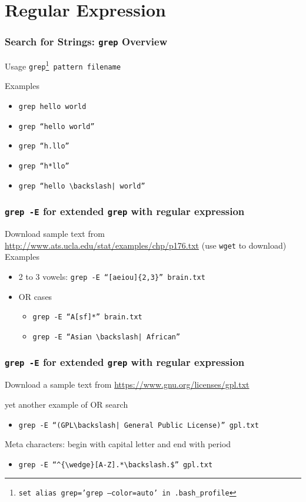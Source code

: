 \documentclass[newPxFont,sthlmFooter,nooffset]{beamer}
\begin{document}
\section{Regular Expression}

\begin{frame}[fragile,t]
  \frametitle{Search for Strings: \texttt{grep} Overview}

\begin{block}{Usage}
\texttt{grep\footnote{set \texttt{alias grep='grep --color=auto'} in .bash\_profile} pattern filename}
\end{block}

\bigskip
Examples
\begin{itemize}
\item \texttt{grep hello world}
\item \texttt{grep ``hello world''}
\item \texttt{grep ``h.llo''}
\item \texttt{grep ``h*llo''}
\item \texttt{grep ``hello $\backslash|$ world''}
\end{itemize}
\end{frame}

\begin{frame}[t]
  \frametitle{\texttt{grep -E} for extended \texttt{grep} with regular
    expression}
Download sample text from \url{http://www.ats.ucla.edu/stat/examples/chp/p176.txt} (use \texttt{wget} to download)
\bigskip
Examples 
\begin{itemize}
\item 2 to 3 vowels: \texttt{grep -E ``[aeiou]\{2,3\}'' brain.txt}
\item OR cases
  \begin{itemize}
  \item  \texttt{grep -E ``A[sf]*'' brain.txt}
  \item \texttt{grep -E ``Asian $\backslash|$ African''}
  \end{itemize}
\end{itemize}
\end{frame}

\begin{frame}[t]
  \frametitle{\texttt{grep -E} for extended \texttt{grep} with regular
    expression}
Download a sample text from \url{https://www.gnu.org/licenses/gpl.txt
}

\bigskip

yet another example of OR search
\begin{itemize}
\item  \texttt{grep -E ``(GPL$\backslash|$ General Public License)'' gpl.txt}
\end{itemize}

\bigskip
Meta characters: begin with capital letter and end with period
\begin{itemize}
\item  \texttt{grep -E ``$^{\wedge}$[A-Z].*$\backslash$.\$'' gpl.txt }
\end{itemize}
\end{frame}
\end{document}
